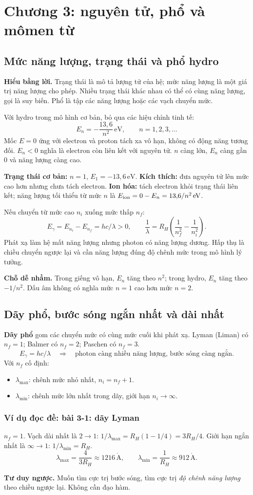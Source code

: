 \documentclass[11pt,a4paper]{article}
\newcommand{\unit}[1]{\,\mathrm{#1}}
\newcommand{\idea}[1]{\par\textbf{Hiểu bằng lời.} #1\par}
\newcommand{\think}[1]{\par\textbf{Tư duy ngược.} #1\par}
\newcommand{\trap}[1]{\par\textbf{Chỗ dễ nhầm.} #1\par}
\newcommand{\ex}[1]{\subsubsection*{Ví dụ đọc đề: #1}}
\newcommand{\chap}[1]{\par\section{#1}}
\begin{document}
\chap{Chương 3: nguyên tử, phổ và mômen từ}
\subsection{Mức năng lượng, trạng thái và phổ hydro}\label{sec:hydrogen}
\idea{Trạng thái là mô tả lượng tử của hệ; mức năng lượng là một giá trị
năng lượng cho phép. Nhiều trạng thái khác nhau có thể có cùng năng lượng,
gọi là suy biến. Phổ là tập các năng lượng hoặc các vạch chuyển mức.}
Với hydro trong mô hình cơ bản, bỏ qua các hiệu chỉnh tinh tế:
\[
E_n=-\frac{13{,}6}{n^2}\unit{eV},\qquad n=1,2,3,\ldots
\]
Mốc $E=0$ ứng với electron và proton tách xa vô hạn, không có động năng
tương đối. $E_n<0$ nghĩa là electron còn liên kết với nguyên tử.
$n$ càng lớn, $E_n$ càng gần 0 và năng lượng càng cao.

\textbf{Trạng thái cơ bản:} $n=1$, $E_1=-13{,}6\unit{eV}$.
\textbf{Kích thích:} đưa nguyên tử lên mức cao hơn nhưng chưa tách electron.
\textbf{Ion hóa:} tách electron khỏi trạng thái liên kết; năng lượng tối thiểu
từ mức $n$ là $E_{\rm ion}=0-E_n=13{,}6/n^2\unit{eV}$.

Nếu chuyển từ mức cao $n_i$ xuống mức thấp $n_f$:
\[
E_\gamma=E_{n_i}-E_{n_f}=hc/\lambda>0,
\qquad
\frac1\lambda=R_H\left(\frac1{n_f^2}-\frac1{n_i^2}\right).
\]
Phát xạ làm hệ mất năng lượng nhưng photon có năng lượng dương.
Hấp thụ là chiều chuyển ngược lại và cần năng lượng đúng độ chênh mức
trong mô hình lý tưởng.

\trap{Trong giếng vô hạn, $E_n$ tăng theo $n^2$; trong hydro, $E_n$ tăng
theo $-1/n^2$. Dấu âm không có nghĩa mức $n=1$ cao hơn mức $n=2$.}

\subsection{Dãy phổ, bước sóng ngắn nhất và dài nhất}\label{sec:series}
\textbf{Dãy phổ} gom các chuyển mức có cùng mức cuối khi phát xạ.
Lyman (Liman) có $n_f=1$; Balmer có $n_f=2$; Paschen có $n_f=3$.
\[
E_\gamma=hc/\lambda
\quad\Rightarrow\quad
\text{photon càng nhiều năng lượng, bước sóng càng ngắn.}
\]
Với $n_f$ cố định:
\begin{itemize}
\item $\lambda_{\max}$: chênh mức nhỏ nhất, $n_i=n_f+1$.
\item $\lambda_{\min}$: chênh mức lớn nhất trong dãy, giới hạn $n_i\to\infty$.
\end{itemize}

\ex{bài 3-1: dãy Lyman}
$n_f=1$. Vạch dài nhất là $2\to1$:
$1/\lambda_{\max}=R_H(1-1/4)=3R_H/4$.
Giới hạn ngắn nhất là $\infty\to1$:
$1/\lambda_{\min}=R_H$.
\[
\lambda_{\max}=\frac4{3R_H}\approx1216\unit{\mathring A},\qquad
\lambda_{\min}=\frac1{R_H}\approx912\unit{\mathring A}.
\]
\think{Muốn tìm cực trị bước sóng, tìm cực trị \emph{độ chênh năng lượng}
theo chiều ngược lại. Không cần đạo hàm.}
\end{document}
